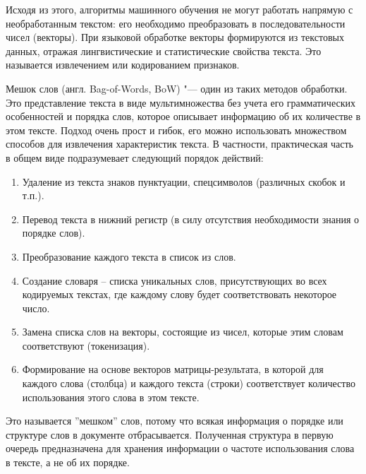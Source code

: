 \documentclass[bachelor, och, coursework]{SCWorks}
\begin{document}
            Исходя из этого, алгоритмы машинного обучения не могут работать
            напрямую с необработанным текстом: его необходимо преобразовать в
            последовательности чисел (векторы). При языковой обработке векторы
            формируются из текстовых данных, отражая лингвистические и
            статистические свойства текста. Это называется извлечением или
            кодированием признаков.
            
            Мешок слов (англ. Bag-of-Words, BoW) "--- один из таких методов
            обработки. Это представление текста в виде мультимножества без учета
            его грамматических особенностей и порядка слов, которое описывает
            информацию об их количестве в этом тексте. Подход очень прост и
            гибок, его можно использовать множеством способов для извлечения
            характеристик текста. В частности, практическая часть в общем виде
            подразумевает следующий порядок действий:

            \begin{enumerate}
                \item Удаление из текста знаков пунктуации, спецсимволов
                (различных скобок и т.п.).
                \item Перевод текста в нижний регистр (в силу отсутствия
                необходимости знания о порядке слов).
                \item Преобразование каждого текста в список из слов.
                \item Создание словаря – списка уникальных слов, присутствующих
                во всех кодируемых текстах, где каждому слову будет
                соответствовать некоторое число.
                \item Замена списка слов на векторы, состоящие из чисел, которые
                этим словам соответствуют (токенизация).
                \item Формирование на основе векторов матрицы-результата, в
                которой для каждого слова (столбца) и каждого текста (строки)
                соответствует количество использования этого слова в этом
                тексте.

            \end{enumerate}

            Это называется ''мешком'' слов, потому что всякая информация о
            порядке или структуре слов в документе отбрасывается. Полученная
            структура в первую очередь предназначена для хранения информации о
            частоте использования слова в тексте, а не об их порядке.
\end{document}
